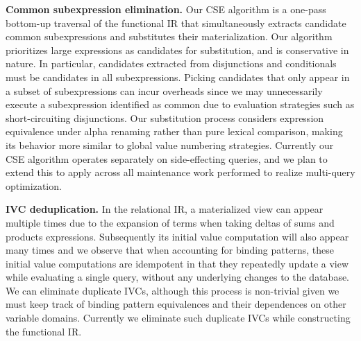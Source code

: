 \vspace{1mm}
\noindent\textbf{Common subexpression elimination.}
Our CSE algorithm is a one-pass bottom-up traversal of the functional IR that
simultaneously extracts candidate common subexpressions and substitutes their
materialization. Our algorithm prioritizes large expressions as candidates for
substitution, and is conservative in nature. In particular, candidates extracted
from disjunctions and conditionals must be candidates in all subexpressions.
Picking candidates that only appear in a subset of subexpressions can incur
overheads since we may unnecessarily execute a subexpression identified as
common due to evaluation strategies such as short-circuiting disjunctions. Our
substitution process considers expression equivalence under alpha renaming
rather than pure lexical comparison, making its behavior more similar to global
value numbering strategies. Currently our CSE algorithm operates separately on
side-effecting queries, and we plan to extend this to apply across all
maintenance work performed to realize multi-query optimization.


\vspace{1mm}
\noindent\textbf{IVC deduplication.} In the relational IR, a materialized view
can appear multiple times due to the expansion of terms when taking deltas of
sums and products expressions. Subsequently its initial value computation
will also appear many times and we observe that when accounting for binding
patterns, these initial value computations are idempotent in that they
repeatedly update a view while evaluating a single query, without any underlying
changes to the database. We can eliminate duplicate IVCs, although this process
is non-trivial given we must keep track of binding pattern equivalences and
their dependences on other variable domains. Currently we eliminate such
duplicate IVCs while constructing the functional IR.




